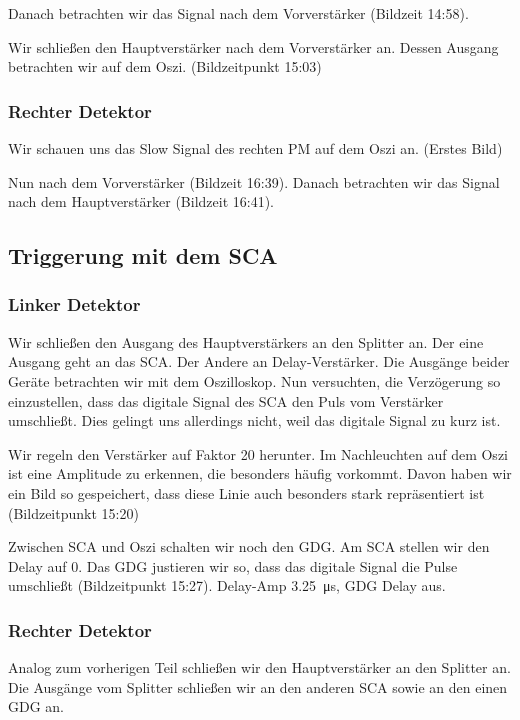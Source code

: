 Danach betrachten wir das Signal nach dem Vorverstärker (Bildzeit 14:58).

Wir schließen den Hauptverstärker nach dem Vorverstärker an. Dessen Ausgang betrachten wir auf dem Oszi. (Bildzeitpunkt 15:03)

\subsubsection{Rechter Detektor}

Wir schauen uns das Slow Signal des rechten PM auf dem Oszi an. (Erstes Bild)

Nun nach dem Vorverstärker (Bildzeit 16:39). Danach betrachten wir das Signal
nach dem Hauptverstärker (Bildzeit 16:41).

\subsection{Triggerung mit dem SCA}

\subsubsection{Linker Detektor}

Wir schließen den Ausgang des Hauptverstärkers an den Splitter an. Der eine
Ausgang geht an das SCA. Der Andere an Delay-Verstärker. Die Ausgänge beider
Geräte betrachten wir mit dem Oszilloskop. Nun versuchten, die Verzögerung so
einzustellen, dass das digitale Signal des SCA den Puls vom Verstärker
umschließt. Dies gelingt uns allerdings nicht, weil das digitale Signal zu kurz
ist.

Wir regeln den Verstärker auf Faktor 20 herunter. Im Nachleuchten auf dem
Oszi ist eine Amplitude zu erkennen, die besonders häufig vorkommt. Davon
haben wir ein Bild so gespeichert, dass diese Linie auch besonders stark
repräsentiert ist (Bildzeitpunkt 15:20)

Zwischen SCA und Oszi schalten wir noch den GDG. Am SCA stellen wir den Delay
auf 0. Das GDG justieren wir so, dass das digitale Signal die Pulse umschließt
(Bildzeitpunkt 15:27). Delay-Amp \SI{3.25}{\micro\second}, GDG Delay aus.

\subsubsection{Rechter Detektor}

Analog zum vorherigen Teil schließen wir den Hauptverstärker an den Splitter
an. Die Ausgänge vom Splitter schließen wir an den anderen SCA sowie an den
einen GDG an.


